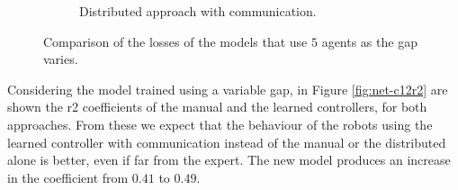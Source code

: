 \begin{figure}[!htb]
\begin{center}
\begin{subfigure}[h]{0.49\textwidth}
			\caption{Distributed approach with communication.}
		\end{subfigure}	
	\end{center}
	\vspace{-0.5cm}
	\caption[Comparison of the losses of the models that use $5$ 
	agents.]{Comparison of the losses of the models that use $5$ agents as 
	the gap varies.}
	\label{fig:commlossn5}
\end{figure}

Considering the model trained using a variable gap, in Figure \ref{fig:net-c12r2} 
are shown the \gls{r2} coefficients of the manual and the learned controllers, for 
both approaches.
From these we expect that the behaviour of the robots using the learned 
controller with communication instead of the manual or the distributed alone is 
better, even if far from the expert. The new model produces an increase in the 
coefficient from $0.41$ to $0.49$.
